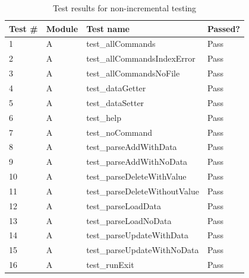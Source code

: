 \documentclass[12pt, letterpaper, titlepage]{article}
\begin{document}
\begin{table}[H]
    \centering
    \caption{Test results for non-incremental testing}
    \label{tab:my-table}
    \begin{tabular}{|l|l|l|l|}
    \hline
    \textbf{Test \#} & \textbf{Module} & \textbf{Test name}            & \textbf{Passed?} \\ \hline
    1                & A               & test\_allCommands             & Pass             \\ \hline
    2                & A               & test\_allCommandsIndexError   & Pass             \\ \hline
    3                & A               & test\_allCommandsNoFile       & Pass             \\ \hline
    4                & A               & test\_dataGetter              & Pass             \\ \hline
    5                & A               & test\_dataSetter              & Pass             \\ \hline
    6                & A               & test\_help                    & Pass             \\ \hline
    7                & A               & test\_noCommand               & Pass             \\ \hline
    8                & A               & test\_parseAddWithData        & Pass             \\ \hline
    9                & A               & test\_parseAddWithNoData      & Pass             \\ \hline
    10               & A               & test\_parseDeleteWithValue    & Pass             \\ \hline
    11               & A               & test\_parseDeleteWithoutValue & Pass             \\ \hline
    12               & A               & test\_parseLoadData           & Pass             \\ \hline
    13               & A               & test\_parseLoadNoData         & Pass             \\ \hline
    14               & A               & test\_parseUpdateWithData     & Pass             \\ \hline
    15               & A               & test\_parseUpdateWithNoData   & Pass             \\ \hline
    16               & A               & test\_runExit                 & Pass             \\ \hline

\end{tabular}
\end{table}
\end{document}
